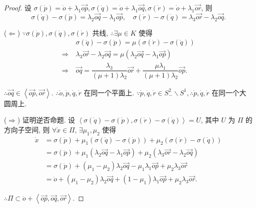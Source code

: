 \documentclass[color=black,device=normal,lang=cn,mode=geye]{elegantnote}
\begin{document}
\begin{proof}
    设 $\sigma(\dot{p})=\dot{o}+\lambda_1\overrightarrow{op},\sigma(\dot{q})=\dot{o}+\lambda_1\overrightarrow{oq},\sigma(\dot{r})=\dot{o}+\lambda_1\overrightarrow{or}$, 则
    \[\sigma(\dot{q})-\sigma(\dot{p})=\lambda_2\overrightarrow{oq}-\lambda_1\overrightarrow{op},\quad\sigma(\dot{r})-\sigma(\dot{q})=\lambda_3\overrightarrow{or}-\lambda_2\overrightarrow{oq}.\]

    ($\Leftarrow$) $\because\sigma(\dot{p}),\sigma(\dot{q}),\sigma(\dot{r})$ 共线, $\therefore\exists\mu\in K$ 使得
    \begin{align*}
        & \sigma(\dot{q})-\sigma(\dot{p})=\mu(\sigma(\dot{r})-\sigma(\dot{q})) \\
        \Rightarrow\ & \lambda_3\overrightarrow{or}-\lambda_2\overrightarrow{oq}=\mu(\lambda_2\overrightarrow{oq}-\lambda_1\overrightarrow{op}) \\
        \Rightarrow\ & \overrightarrow{oq}=\dfrac{\lambda_3}{(\mu+1)\lambda_2}\overrightarrow{or}+\dfrac{\mu\lambda_1}{(\mu+1)\lambda_2}\overrightarrow{op}.
    \end{align*}

    $\therefore\overrightarrow{oq}\in\left<\overrightarrow{op},\overrightarrow{or}\right>$. $\therefore\dot{o},\dot{p},\dot{q},\dot{r}$ 在同一个平面上. $\because\dot{p},\dot{q},\dot{r}\in S^2_-\backslash S^1,\therefore\dot{p},\dot{q},\dot{r}$ 在同一个大圆周上.

    ($\Rightarrow$) 证明逆否命题. 设 $\left<\sigma(\dot{q})-\sigma(\dot{p}),\sigma(\dot{r})-\sigma(\dot{q})\right>=U$, 其中 $U$ 为 $\varPi$ 的方向子空间, 则 $\forall\dot{x}\in\varPi$, $\exists\mu_1,\mu_2$ 使得
    \begin{align*}
        \dot{x} & =\sigma(\dot{p})+\mu_1(\sigma(\dot{q})-\sigma(\dot{p}))+\mu_2(\sigma(\dot{r})-\sigma(\dot{q})) \\
        & =\sigma(\dot{p})+\mu_1(\lambda_2\overrightarrow{oq}-\lambda_1\overrightarrow{op})+\mu_2(\lambda_3\overrightarrow{or}-\lambda_2\overrightarrow{oq}) \\
        & =\sigma(\dot{p})+(\mu_1-\mu_2)\lambda_2\overrightarrow{oq}-\mu_1\lambda_1\overrightarrow{op}+\mu_2\lambda_3\overrightarrow{or} \\
        & =\dot{o}+(\mu_1-\mu_2)\lambda_2\overrightarrow{oq}+(1-\mu_1)\lambda_1\overrightarrow{op}+\mu_2\lambda_3\overrightarrow{or}.
    \end{align*}

    $\therefore\varPi\subset\dot{o}+\left<\overrightarrow{op},\overrightarrow{oq},\overrightarrow{or}\right>$.


\end{proof}
\end{document}
